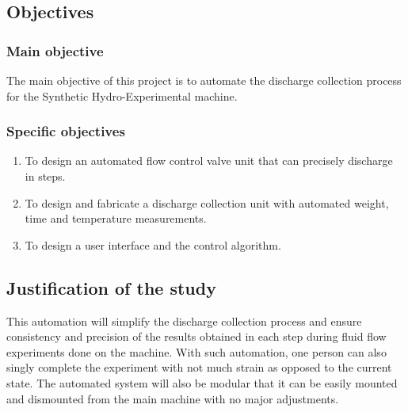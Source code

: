 \subsection{Objectives}
\subsubsection{Main objective}

The main objective of this project is to automate the discharge collection process for the Synthetic Hydro-Experimental machine. 

\subsubsection{Specific objectives}

\begin{enumerate}
	\item To design an automated flow control valve unit that can precisely discharge in steps.
	\item To design and fabricate a discharge collection unit with automated weight, time and temperature measurements.
    \item To design a user interface and the control algorithm.

\end{enumerate}


\subsection{Justification of the study}

This automation will simplify the discharge collection process and ensure consistency and precision of the results obtained in each step during fluid flow experiments done on the machine. With such automation, one person can also singly complete the experiment with not much strain as opposed to the current state. The automated system will also be modular that it can be easily mounted and dismounted from the main machine with no major adjustments.